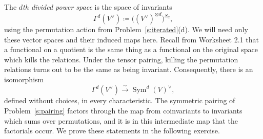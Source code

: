 \documentclass[12pt,reqno]{amsart}
\DeclareMathOperator{\Sym}{Sym}
\begin{document}
The \emph{$d$th divided power space} is the space of invariants
\[
\Gamma^d(V^{\vee})\coloneqq\bigl((V^{\vee})^{\otimes d}\bigr)^{S_d},
\]
using the permutation action from Problem~\ref{s:iterated}(d). We will need only these vector spaces and their induced maps here. Recall from Worksheet 2.1 that a functional on a quotient is the same thing as a functional on the original space which kills the relations. Under the tensor pairing, killing the permutation relations turns out to be the same as being invariant. Consequently, there is an isomorphism
\[
\Gamma^d(V^{\vee})\xrightarrow{\ \sim\ }\Sym^d(V)^{\vee},
\]
defined without choices, in every characteristic. The symmetric pairing of Problem~\ref{s:pairing} factors through the map from coinvariants to invariants which sums over permutations, and it is in this intermediate map that the factorials occur. We prove these statements in the following exercise.

\hrulefill
\end{document}
